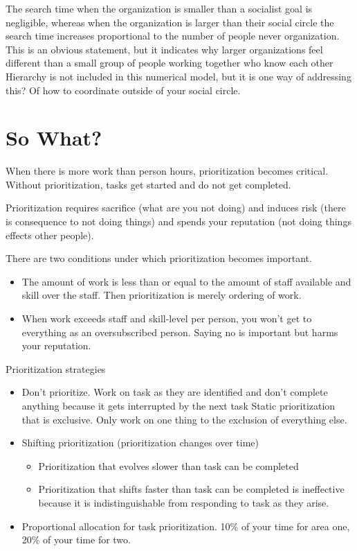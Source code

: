 The search time when the organization is smaller than a socialist goal is negligible, whereas when the organization is larger than their social circle the search time increases proportional to the number of people never organization. This is an obvious statement, but it indicates why larger organizations feel different than a small group of people working together who know each other
Hierarchy is not included in this numerical model, but it is one way of addressing this? Of how to coordinate outside of your social circle.



\section{So What?}


When there is more work than person hours, prioritization becomes critical. Without prioritization, tasks get started and do not get completed.

Prioritization requires sacrifice (what are you not doing) and induces risk (there is consequence to not doing things) and spends your reputation (not doing things effects other people).

There are two conditions under which prioritization becomes important. 
\begin{itemize}
    \item The amount of work is less than or equal to the amount of staff available and skill over the staff. Then prioritization is merely ordering of work.
    \item When work exceeds staff and skill-level per person, you won't get to everything as an oversubscribed person. Saying no is important but harms your reputation.
\end{itemize}


Prioritization strategies
\begin{itemize}
    \item Don't prioritize. Work on task as they are identified and don't complete anything because it gets interrupted by the next task
Static prioritization that is exclusive. Only work on one thing to the exclusion of everything else.
    \item Shifting prioritization (prioritization changes over time)
    \begin{itemize}
        \item Prioritization that evolves slower than task can be completed
        \item Prioritization that shifts faster than task can be completed is ineffective because it is indistinguishable from responding to task as they arise.
    \end{itemize}
    \item Proportional allocation for task prioritization. 10\% of your time for area one, 20\% of your time for two. 
\end{itemize}
